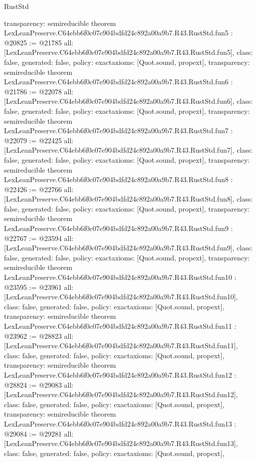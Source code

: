 \begin{lexlean}{RustStd}
\begin{coremodule}
{  transparency: semireducible
}
theorem LexLeanPreserve.C64ebb6f0c07e904bdfd24c892a00a9b7.R43.RustStd.fun5 : @20825 := @21785 {
  all: [LexLeanPreserve.C64ebb6f0c07e904bdfd24c892a00a9b7.R43.RustStd.fun5],
  class: false,
  generated: false,
  policy: exact{axioms: [Quot.sound, propext]},
  transparency: semireducible
}
theorem LexLeanPreserve.C64ebb6f0c07e904bdfd24c892a00a9b7.R43.RustStd.fun6 : @21786 := @22078 {
  all: [LexLeanPreserve.C64ebb6f0c07e904bdfd24c892a00a9b7.R43.RustStd.fun6],
  class: false,
  generated: false,
  policy: exact{axioms: [Quot.sound, propext]},
  transparency: semireducible
}
theorem LexLeanPreserve.C64ebb6f0c07e904bdfd24c892a00a9b7.R43.RustStd.fun7 : @22079 := @22425 {
  all: [LexLeanPreserve.C64ebb6f0c07e904bdfd24c892a00a9b7.R43.RustStd.fun7],
  class: false,
  generated: false,
  policy: exact{axioms: [Quot.sound, propext]},
  transparency: semireducible
}
theorem LexLeanPreserve.C64ebb6f0c07e904bdfd24c892a00a9b7.R43.RustStd.fun8 : @22426 := @22766 {
  all: [LexLeanPreserve.C64ebb6f0c07e904bdfd24c892a00a9b7.R43.RustStd.fun8],
  class: false,
  generated: false,
  policy: exact{axioms: [Quot.sound, propext]},
  transparency: semireducible
}
theorem LexLeanPreserve.C64ebb6f0c07e904bdfd24c892a00a9b7.R43.RustStd.fun9 : @22767 := @23594 {
  all: [LexLeanPreserve.C64ebb6f0c07e904bdfd24c892a00a9b7.R43.RustStd.fun9],
  class: false,
  generated: false,
  policy: exact{axioms: [Quot.sound, propext]},
  transparency: semireducible
}
theorem LexLeanPreserve.C64ebb6f0c07e904bdfd24c892a00a9b7.R43.RustStd.fun10 : @23595 := @23961 {
  all: [LexLeanPreserve.C64ebb6f0c07e904bdfd24c892a00a9b7.R43.RustStd.fun10],
  class: false,
  generated: false,
  policy: exact{axioms: [Quot.sound, propext]},
  transparency: semireducible
}
theorem LexLeanPreserve.C64ebb6f0c07e904bdfd24c892a00a9b7.R43.RustStd.fun11 : @23962 := @28823 {
  all: [LexLeanPreserve.C64ebb6f0c07e904bdfd24c892a00a9b7.R43.RustStd.fun11],
  class: false,
  generated: false,
  policy: exact{axioms: [Quot.sound, propext]},
  transparency: semireducible
}
theorem LexLeanPreserve.C64ebb6f0c07e904bdfd24c892a00a9b7.R43.RustStd.fun12 : @28824 := @29083 {
  all: [LexLeanPreserve.C64ebb6f0c07e904bdfd24c892a00a9b7.R43.RustStd.fun12],
  class: false,
  generated: false,
  policy: exact{axioms: [Quot.sound, propext]},
  transparency: semireducible
}
theorem LexLeanPreserve.C64ebb6f0c07e904bdfd24c892a00a9b7.R43.RustStd.fun13 : @29084 := @29281 {
  all: [LexLeanPreserve.C64ebb6f0c07e904bdfd24c892a00a9b7.R43.RustStd.fun13],
  class: false,
  generated: false,
  policy: exact{axioms: [Quot.sound, propext]},
}
\end{coremodule}
\end{lexlean}
